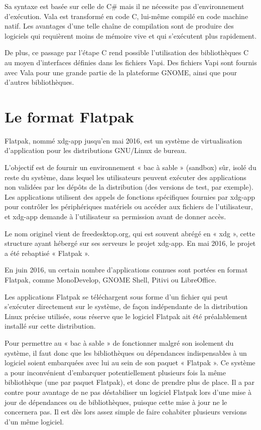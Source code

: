 \documentclass[12pt]{report}
\begin{document}
Sa syntaxe est basée sur celle de C\# mais il ne nécessite pas
d'environnement d'exécution. Vala est transformé en code C, lui-même
compilé en code machine natif. Les avantages d'une telle chaîne de
compilation sont de produire des logiciels qui requièrent moins de
mémoire vive et qui s'exécutent plus rapidement.

De plus, ce passage par l'étape C rend possible l'utilisation des
bibliothèques C au moyen d'interfaces définies dans les fichiers
Vapi. Des fichiers Vapi sont fournis avec Vala pour une grande partie
de la plateforme GNOME, ainsi que pour d'autres bibliothèques.

\section{Le format Flatpak}
Flatpak, nommé xdg-app jusqu’en mai 2016, est un système de
virtualisation d’application pour les distributions GNU/Linux de
bureau.

L'objectif est de fournir un environnement « bac à sable » (sandbox)
sûr, isolé du reste du système, dans lequel les utilisateurs peuvent
exécuter des applications non validées par les dépôts de la
distribution (des versions de test, par exemple). Les applications
utilisent des appels de fonctions spécifiques fournies par xdg-app
pour contrôler les périphériques matériels ou accéder aux fichiers de
l'utilisateur, et xdg-app demande à l'utilisateur sa permission avant
de donner accès.

Le nom originel vient de freedesktop.org, qui est souvent abrégé en «
xdg », cette structure ayant hébergé sur ses serveurs le projet
xdg-app. En mai 2016, le projet a été rebaptisé « Flatpak ».

En juin 2016, un certain nombre d'applications connues sont portées en
format Flatpak, comme MonoDevelop, GNOME Shell, Pitivi ou LibreOffice.

Les applications Flatpak se téléchargent sous forme d'un fichier qui
peut s’exécuter directement sur le système, de façon indépendante de
la distribution Linux précise utilisée, sous réserve que le logiciel
Flatpak ait été préalablement installé sur cette distribution.

Pour permettre au « bac à sable » de fonctionner malgré son isolement
du système, il faut donc que les bibliothèques ou dépendances
indispensables à un logiciel soient embarquées avec lui au sein de son
paquet « Flatpak ». Ce système a pour inconvénient d'embarquer
potentiellement plusieurs fois la même bibliothèque (une par paquet
Flatpak), et donc de prendre plus de place. Il a par contre pour
avantage de ne pas déstabiliser un logiciel Flatpak lors d'une mise à
jour de dépendances ou de bibliothèques, puisque cette mise à jour ne
le concernera pas. Il est dès lors assez simple de faire cohabiter
plusieurs versions d'un même logiciel.
\end{document}
